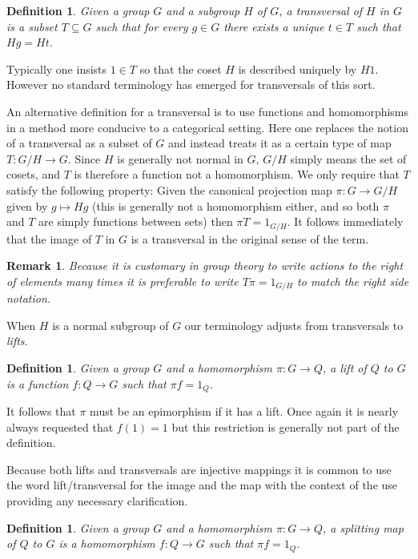 \documentclass[12pt]{article}
\newtheorem{defn}[thm]{Definition}
\newtheorem{remark}[thm]{Remark}
\begin{document}
\begin{defn}
Given a group $G$ and a subgroup $H$ of $G$, a \emph{transversal} of $H$ in $G$
is a subset $T\subseteq G$ such that for every $g\in G$ there exists a unique
$t\in T$ such that $Hg=Ht$.
\end{defn}

Typically one insists $1\in T$ so that the coset $H$ is described uniquely
by $H1$.  However no standard terminology has emerged for transversals of this sort.  

An alternative definition for a transversal is to use functions and homomorphisms in a method more conducive to a categorical setting.  Here one replaces the notion of a transversal as a subset of $G$ and instead treats it as a certain type of map $T:G/H\rightarrow G$.  Since $H$ is generally not normal in $G$, $G/H$ simply means the set of cosets, and $T$ is therefore a function not a homomorphism.  We only require that $T$ satisfy the following property:  Given the canonical projection map $\pi:G\rightarrow G/H$ given by $g\mapsto Hg$ (this is generally not a homomorphism either, and so both $\pi$ and $T$ are simply functions between sets) then $\pi T=1_{G/H}$.  It follows immediately that the image of $T$ in $G$ is a transversal in the original sense of the term.

\begin{remark}
Because it is customary in group theory to write actions to the right of elements many times it is preferable to write $T\pi=1_{G/H}$ to match the right side notation.
\end{remark}

When $H$ is a normal subgroup of $G$ our terminology adjusts from transversals to \emph{lifts}.

\begin{defn}
Given a group $G$ and a homomorphism $\pi:G\rightarrow Q$, a \emph{lift} of $Q$ to $G$ is a function $f:Q\rightarrow G$ such that $\pi f=1_Q$.
\end{defn}

It follows that $\pi$ must be an epimorphism if it has a lift.  Once again it is nearly always requested that $f(1)=1$ but this restriction is generally not part of the definition.

Because both lifts and transversals are injective mappings it is common to use the word lift/transversal for the image and the map with the context of the use providing any necessary clarification.

\begin{defn}
Given a group $G$ and a homomorphism $\pi:G\rightarrow Q$, a \emph{splitting map} of $Q$ to $G$ is a \emph{homomorphism} $f:Q\rightarrow G$ such that $\pi f=1_Q$.
\end{defn}
\end{document}
